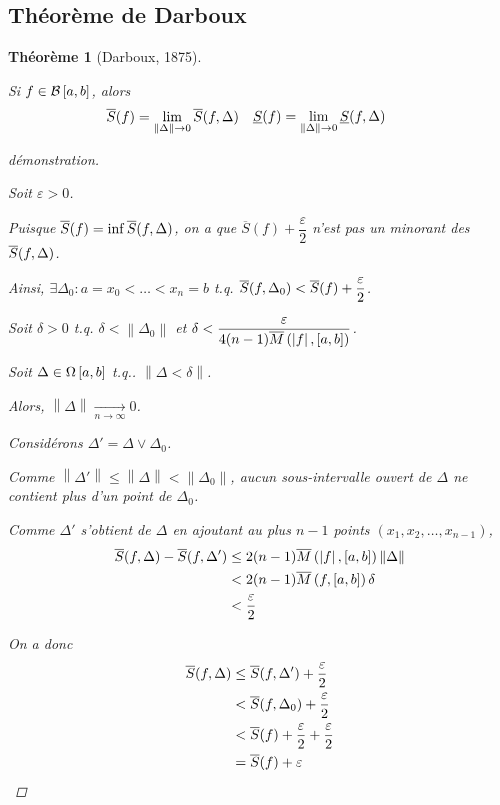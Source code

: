 \documentclass{report}
\newcommand*{\Ssup}[1]{\overline{S}(#1)}
\newcommand*{\Sinf}[1]{\underline{S}(#1)}
\newcommand*{\raffinement}[2]{#1 \vee #2}
\newcommand*{\norme}[1]{\left\| #1 \right\|}
\newcommand*{\abs}[1]{\left| #1 \right|}
\newcommand*{\eps}{\varepsilon}
\newtheorem*{thm}{Th\'eor\`eme}
\theoremstyle{definition}
\theoremstyle{remark}
\begin{document}
	\subsection{Th\'eor\`eme de Darboux}
	\begin{thm}[Darboux, 1875]
		~

		Si $f \in \bornee$, alors
		\begin{align*}
			\begin{split}
				\Ssup{f}&= \lim\limits_{\norme{\Delta} \to 0} \ssup{f}
			\end{split}
			&
			\begin{split}
				\Sinf{f}&= \lim\limits_{\norme{\Delta} \to 0} \sinf{f}
			\end{split}
		\end{align*}

		\begin{proof}[d\'emonstration]~

			Soit $\eps>0$.

			Puisque $\Ssup{f} = \inf \ssup{f}$, on a que $\Ssup{f} + \dfrac{\eps}{2}$ n'est pas un minorant des $\ssup{f}$.

			Ainsi, $\exists\Delta_0 : a=x_0 < \dotsc < x_n=b$ t.q. $\ssup{f}[\Delta_0] < \Ssup{f} + \dfrac{\eps}{2}$.

			Soit $\delta>0$ t.q. $\delta < \norme{\Delta_0}$ et $\delta < \dfrac{\eps}{4 (n-1) \msup{\abs{f}}}$.

			Soit $\Delta \in \partitions$ t.q.. $\norme{\Delta < \delta}$.

			Alors, $\norme{\Delta} \xrightarrow[n \to \infty]{} 0$.

			Consid\'erons $\Delta' = \raffinement{\Delta}{\Delta_0}$.

			Comme $\norme{\Delta'} \leq \norme{\Delta} < \norme{\Delta_0}$, aucun sous-intervalle ouvert de $\Delta$ ne contient plus d'un point de $\Delta_0$.

			Comme $\Delta'$ s'obtient de $\Delta$ en ajoutant au plus $n-1$ points $\left( x_1, x_2, \dotsc, x_{n-1} \right)$,
			\begin{align*}
				\ssup{f} - \ssup{f}[\Delta'] &\leq 2(n-1) \msup{\abs{f}} \norme{\Delta}\\
				&< 2(n-1) \msup{f} \delta\\
				&< \dfrac{\eps}{2}
			\end{align*}

			On a donc
			\begin{align*}
				\ssup{f} &\leq \ssup{f}[\Delta'] + \dfrac{\eps}{2}\\
				&< \ssup{f}[\Delta_0] + \dfrac{\eps}{2}\\
				&< \Ssup{f} + \dfrac{\eps}{2} + \dfrac{\eps}{2}\\
				&= \Ssup{f} + \eps
			\end{align*}


\end{proof}
\end{thm}
\end{document}
